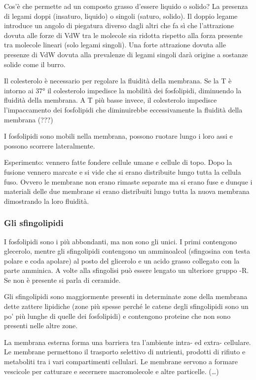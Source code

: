 \documentclass[]{article}
\begin{document}
Cos'è che permette ad un composto grasso d'essere liquido o solido? La
presenza di legami doppi (insaturo, liquido) o singoli (saturo, solido).
Il doppio legame introduce un angolo di piegatura diverso dagli altri
che fa sì che l'attrazione dovuta alle forze di VdW tra le molecole sia
ridotta rispetto alla forza presente tra molecole lineari (solo legami
singoli). Una forte attrazione dovuta alle presenze di VdW dovuta alla
prevalenze di legami singoli darà origine a sostanze solide come il
burro.

Il colesterolo è necessario per regolare la fluidità della membrana. Se
la T è intorno ai 37° il colesterolo impedisce la mobilità dei
fosfolipidi, diminuendo la fluidità della membrana. A T più basse
invece, il colesterolo impedisce l'impaccamento dei fosfolipidi che
diminuirebbe eccessivamente la fluidità della membrana (???)

I fosfolipidi sono mobili nella membrana, possono ruotare lungo i loro
assi e possono scorrere lateralmente.

Esperimento: vennero fatte fondere cellule umane e cellule di topo. Dopo
la fusione vennero marcate e si vide che si erano distribuite lungo
tutta la cellula fuso. Ovvero le membrane non erano rimaste separate ma
si erano fuse e dunque i materiali delle due membrane si erano
distribuiti lungo tutta la nuova membrana dimostrando la loro fluidità.

\subsubsection{Gli sfingolipidi}\label{gli-sfingolipidi}

I fosfolipidi sono i più abbondanti, ma non sono gli unici. I primi
contengono glecerolo, mentre gli sfingolipidi contengono un amminoalcol
(sfingosina con testa polare e coda apolare) al posto del glicerolo e un
acido grasso collegato con la parte amminica. A volte alla sfingolisi
può essere lengato un ulteriore gruppo -R. Se non è presente si parla di
ceramide.

Gli sfingolipidi sono maggiormente presenti in determinate zone della
membrana dette zattere lipidiche (zone più spesse perché le catene degli
sfingolipidi sono un po' più lunghe di quelle dei fosfolipidi) e
contengono proteine che non sono presenti nelle altre zone.

La membrana esterna forma una barriera tra l'ambiente intra- ed extra-
cellulare. Le membrane permettono il trasporto selettivo di nutrienti,
prodotti di rifiuto e metaboliti tra i vari compartimenti cellulari. Le
membrane servono a formare vescicole per catturare e secernere
macromolecole e altre particelle. (\ldots{})
\end{document}
